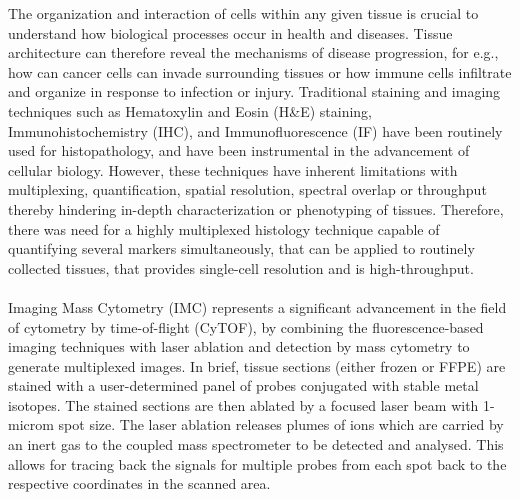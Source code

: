 The organization and interaction of cells within any given tissue is crucial to understand how biological processes occur in health and diseases. Tissue architecture can therefore reveal the mechanisms of disease progression, for e.g., how can cancer cells can invade surrounding tissues or how immune cells infiltrate and organize in response to infection or injury. Traditional staining and imaging techniques such as Hematoxylin and Eosin (H\&E) staining, Immunohistochemistry (IHC), and Immunofluorescence (IF) have been routinely used for histopathology, and have been instrumental in the advancement of cellular biology. However, these techniques have inherent limitations with multiplexing, quantification, spatial resolution, spectral overlap or throughput thereby hindering in-depth characterization or phenotyping of tissues. Therefore, there was need for a highly multiplexed histology technique capable of quantifying several markers simultaneously, that can be applied to routinely collected tissues, that provides single-cell resolution and is high-throughput.\\\\
Imaging Mass Cytometry (IMC) represents a significant advancement in the field of cytometry by time-of-flight (CyTOF), by combining the fluorescence-based imaging techniques with laser ablation and detection by mass cytometry to generate multiplexed images. In brief, tissue sections (either frozen or FFPE) are stained with a user-determined panel of probes conjugated with stable metal isotopes. The stained sections are then ablated by a focused laser beam with 1-microm spot size. The laser ablation releases plumes of ions which are carried by an inert gas to the coupled mass spectrometer to be detected and analysed. This allows for tracing back the signals for multiple probes from each spot back to the respective coordinates in the scanned area.  


